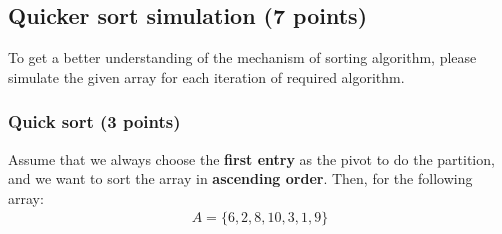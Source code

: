 \documentclass[11pt]{exam}
\begin{document}
	


\subsection{Quicker sort simulation (7 points)}
To get a better understanding of the mechanism of sorting algorithm, please simulate the given array for each iteration of required algorithm.

\subsubsection{Quick sort (3 points)}

Assume that we always choose the \textbf{first entry} as the pivot to do the partition, and we want to sort the array in \textbf{ascending order}. Then, for the following array:
\begin{align*}
A = \{6, 2, 8, 10, 3, 1, 9\}
\end{align*}
\end{document}
